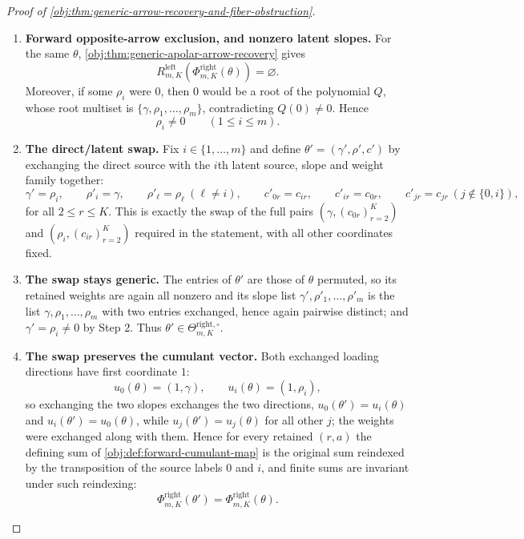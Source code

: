 \documentclass[11pt]{article}
\begin{document}
\begin{proof}[Proof of \cref{obj:thm:generic-arrow-recovery-and-fiber-obstruction}]
\begin{enumerate}
\item \textbf{Forward opposite-arrow exclusion, and nonzero latent slopes.}  For the same \(\theta\), \cref{obj:thm:generic-apolar-arrow-recovery} gives
\[
R^{\mathrm{left}}_{m,K}\!\left(\Phi^{\mathrm{right}}_{m,K}(\theta)\right)=\varnothing .
\]
Moreover, if some \(\rho_i\) were \(0\), then \(0\) would be a root of the polynomial \(Q\), whose root multiset is \(\{\gamma,\rho_1,\ldots,\rho_m\}\), contradicting \(Q(0)\ne0\).  Hence
\[
\rho_i\ne0\qquad(1\le i\le m).
\]

\item \textbf{The direct/latent swap.}  Fix \(i\in\{1,\ldots,m\}\) and define \(\theta'=(\gamma',\rho',c')\) by exchanging the direct source with the \(i\)th latent source, slope and weight family together:
\[
\gamma'=\rho_i,
\qquad
\rho'_i=\gamma,
\qquad \rho'_\ell=\rho_\ell\ (\ell\ne i),
\qquad
c'_{0r}=c_{ir},
\qquad c'_{ir}=c_{0r},
\qquad c'_{jr}=c_{jr}\ (j\notin\{0,i\}),
\]
for all \(2\le r\le K\).  This is exactly the swap of the full pairs \((\gamma,(c_{0r})_{r=2}^K)\) and \((\rho_i,(c_{ir})_{r=2}^K)\) required in the statement, with all other coordinates fixed.

\item \textbf{The swap stays generic.}  The entries of \(\theta'\) are those of \(\theta\) permuted, so its retained weights are again all nonzero and its slope list \(\gamma',\rho'_1,\ldots,\rho'_m\) is the list \(\gamma,\rho_1,\ldots,\rho_m\) with two entries exchanged, hence again pairwise distinct; and \(\gamma'=\rho_i\ne0\) by Step 2.  Thus \(\theta'\in\Theta^{\mathrm{right},\circ}_{m,K}\).

\item \textbf{The swap preserves the cumulant vector.}  Both exchanged loading directions have first coordinate \(1\):
\[
u_0(\theta)=(1,\gamma),\qquad u_i(\theta)=(1,\rho_i),
\]
so exchanging the two slopes exchanges the two directions, \(u_0(\theta')=u_i(\theta)\) and \(u_i(\theta')=u_0(\theta)\), while \(u_j(\theta')=u_j(\theta)\) for all other \(j\); the weights were exchanged along with them.  Hence for every retained \((r,a)\) the defining sum of \cref{obj:def:forward-cumulant-map} is the original sum reindexed by the transposition of the source labels \(0\) and \(i\), and finite sums are invariant under such reindexing:
\[
\Phi^{\mathrm{right}}_{m,K}(\theta')=\Phi^{\mathrm{right}}_{m,K}(\theta).
\]


\end{enumerate}
\end{proof}
\end{document}
